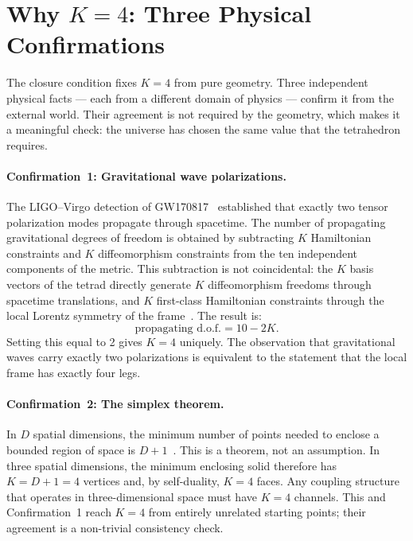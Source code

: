 \documentclass[a4paper,11pt]{article}
\begin{document}
\section{Why $K = 4$: Three Physical Confirmations}

The closure condition fixes $K = 4$ from pure geometry.
Three independent physical facts --- each from a different
domain of physics --- confirm it from the external world.
Their agreement is not required by the geometry, which
makes it a meaningful check: the universe has chosen
the same value that the tetrahedron requires.

\paragraph{Confirmation~1: Gravitational wave polarizations.}
The LIGO--Virgo detection of GW170817~\cite{LIGO2017}
established that exactly two tensor polarization modes
propagate through spacetime. The number of propagating
gravitational degrees of freedom is obtained by
subtracting $K$ Hamiltonian constraints and $K$
diffeomorphism constraints from the ten independent
components of the metric. This subtraction is not
coincidental: the $K$ basis vectors of the tetrad
directly generate $K$ diffeomorphism freedoms through
spacetime translations, and $K$ first-class Hamiltonian
constraints through the local Lorentz symmetry of the
frame~\cite{MTW,Carroll}. The result is:
\begin{equation}
  \text{propagating d.o.f.} = 10 - 2K.
\end{equation}
Setting this equal to 2 gives $K = 4$ uniquely. The
observation that gravitational waves carry exactly two
polarizations is equivalent to the statement that the
local frame has exactly four legs.

\paragraph{Confirmation~2: The simplex theorem.}
In $D$ spatial dimensions, the minimum number of points
needed to enclose a bounded region of space is $D + 1$~\cite{MTW}.
This is a theorem, not an assumption. In three spatial
dimensions, the minimum enclosing solid therefore has
$K = D + 1 = 4$ vertices and, by self-duality, $K = 4$
faces. Any coupling structure that operates in
three-dimensional space must have $K = 4$ channels.
This and Confirmation~1 reach $K = 4$ from entirely
unrelated starting points; their agreement is a
non-trivial consistency check.
\end{document}
